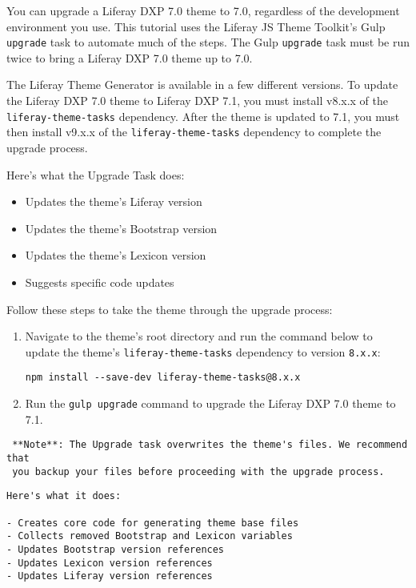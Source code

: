 You can upgrade a Liferay DXP 7.0 theme to 7.0, regardless of the
development environment you use. This tutorial uses the Liferay JS Theme
Toolkit's Gulp \texttt{upgrade} task to automate much of the steps. The
Gulp \texttt{upgrade} task must be run twice to bring a Liferay DXP 7.0
theme up to 7.0.

The Liferay Theme Generator is available in a few different versions. To
update the Liferay DXP 7.0 theme to Liferay DXP 7.1, you must install
v8.x.x of the \texttt{liferay-theme-tasks} dependency. After the theme
is updated to 7.1, you must then install v9.x.x of the
\texttt{liferay-theme-tasks} dependency to complete the upgrade process.

Here's what the Upgrade Task does:

\begin{itemize}
\tightlist
\item
  Updates the theme's Liferay version
\item
  Updates the theme's Bootstrap version
\item
  Updates the theme's Lexicon version
\item
  Suggests specific code updates
\end{itemize}

Follow these steps to take the theme through the upgrade process:

\begin{enumerate}
\def\labelenumi{\arabic{enumi}.}
\item
  Navigate to the theme's root directory and run the command below to
  update the theme's \texttt{liferay-theme-tasks} dependency to version
  \texttt{8.x.x}:

\begin{verbatim}
npm install --save-dev liferay-theme-tasks@8.x.x
\end{verbatim}
\item
  Run the \texttt{gulp\ upgrade} command to upgrade the Liferay DXP 7.0
  theme to 7.1.
\end{enumerate}

\noindent\hrulefill

\begin{verbatim}
 **Note**: The Upgrade task overwrites the theme's files. We recommend that 
 you backup your files before proceeding with the upgrade process.
\end{verbatim}

\noindent\hrulefill

\begin{verbatim}
Here's what it does:

- Creates core code for generating theme base files
- Collects removed Bootstrap and Lexicon variables
- Updates Bootstrap version references
- Updates Lexicon version references
- Updates Liferay version references
\end{verbatim}

